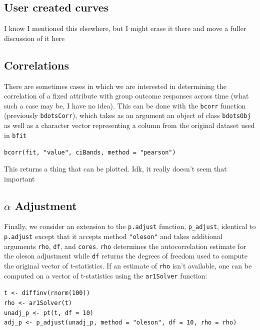 \documentclass{article}
\begin{document}
\subsection{User created curves}

I know I mentioned this elsewhere, but I might erase it there and move a fuller discussion of it here

\subsection{Correlations}

There are sometimes cases in which we are interested in determining the correlation of a fixed attribute with group outcome responses across time (what such a case may be, I have no idea). This can be done with the \texttt{bcorr} function (previously \texttt{bdotsCorr}), which takes as an argument an object of class \texttt{bdotsObj} as well as a character vector representing a column from the original dataset used in \texttt{bfit}

\begin{center}
\texttt{bcorr(fit, "value", ciBands, method = "pearson")} 
\end{center}

This returns a thing that can be plotted. Idk, it really doesn't seem that important 

\subsection{$\alpha$ Adjustment}

Finally, we consider an extension to the \texttt{p.adjust} function, \texttt{p\_adjust}, identical to \texttt{p.adjust} except that it accepts method \texttt{"oleson"} and takes additional arguments \texttt{rho}, \texttt{df}, and \texttt{cores}. \texttt{rho} determines the autocorrelation estimate for the oleson adjustment while \texttt{df} returns the degrees of freedom used to compute the original vector of t-statistics. If an estimate of \texttt{rho} isn't available, one can be computed on a vector of t-statistics using the \texttt{ar1Solver} function:

\begin{center}
\texttt{t <- diffinv(rnorm(100))} \\
\texttt{rho <- ar1Solver(t)} \\
\texttt{unadj\_p <- pt(t, df = 10)} \\
\texttt{adj\_p <- p\_adjust(unadj\_p, method = "oleson", df = 10, rho = rho)}
\end{center}
\end{document}
